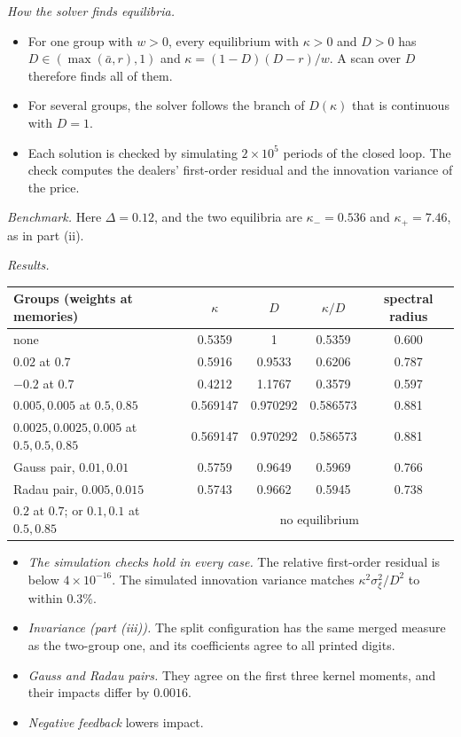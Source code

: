 \documentclass[12pt]{article}
\theoremstyle{definition}
\theoremstyle{remark}
\begin{document}
\emph{How the solver finds equilibria.}
\begin{itemize}[itemsep=1pt,topsep=2pt]
\item For one group with $w>0$, every equilibrium with $\kappa>0$ and $D>0$ has $D\in(\max(\bar a,r),1)$ and $\kappa=(1-D)(D-r)/w$. A scan over $D$ therefore finds all of them.
\item For several groups, the solver follows the branch of $D(\kappa)$ that is continuous with $D=1$.
\item Each solution is checked by simulating $2\times10^5$ periods of the closed loop. The check computes the dealers' first-order residual and the innovation variance of the price.
\end{itemize}

\emph{Benchmark.} Here $\Delta=0.12$, and the two equilibria are $\kappa_-=0.536$ and $\kappa_+=7.46$, as in part (ii).

\emph{Results.}
\begin{center}\small
\begin{tabular}{lcccc}
\hline
Groups (weights at memories) & $\kappa$ & $D$ & $\kappa/D$ & spectral radius\\
\hline
none & 0.5359 & 1 & 0.5359 & 0.600\\
$0.02$ at $0.7$ & 0.5916 & 0.9533 & 0.6206 & 0.787\\
$-0.2$ at $0.7$ & 0.4212 & 1.1767 & 0.3579 & 0.597\\
$0.005,0.005$ at $0.5,0.85$ & 0.569147 & 0.970292 & 0.586573 & 0.881\\
$0.0025,0.0025,0.005$ at $0.5,0.5,0.85$ & 0.569147 & 0.970292 & 0.586573 & 0.881\\
Gauss pair, $0.01,0.01$ & 0.5759 & 0.9649 & 0.5969 & 0.766\\
Radau pair, $0.005,0.015$ & 0.5743 & 0.9662 & 0.5945 & 0.738\\
$0.2$ at $0.7$; or $0.1,0.1$ at $0.5,0.85$ & \multicolumn{4}{c}{no equilibrium}\\
\hline
\end{tabular}
\end{center}
\begin{itemize}[itemsep=1pt,topsep=2pt]
\item \emph{The simulation checks hold in every case.} The relative first-order residual is below $4\times10^{-16}$. The simulated innovation variance matches $\kappa^2\sigma_\xi^2/D^2$ to within $0.3\%$.
\item \emph{Invariance (part (iii)).} The split configuration has the same merged measure as the two-group one, and its coefficients agree to all printed digits.
\item \emph{Gauss and Radau pairs.} They agree on the first three kernel moments, and their impacts differ by $0.0016$.
\item \emph{Negative feedback} lowers impact.
\end{itemize}
\end{document}
